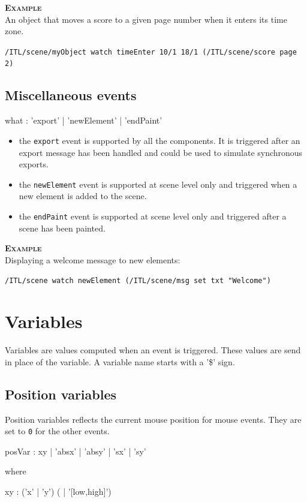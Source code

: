 \documentclass[a4paper,twoside]{report}
\newcommand{\sublevel}[1]	{\section{#1}}
\newcommand{\subsublevel}[1]	{\subsection{#1}}
\newcommand{\OSC}[1]		{\texttt{#1}}
\newcommand{\values}[1]	{\texttt{#1}}
\newcommand{\example}		{\textbf{\hspace{-1.5cm}\textbf{\textsc{Example }}}}
\newcommand{\sample}	[1]			{\vspace{-2mm}\begin{center}\colorbox{mygrey}{
								\begin{minipage}[t]{0.9\columnwidth} 
								{\small \texttt{#1}}
								\end{minipage}}\end{center}}
\newcommand{\samplev}[1]			{\begin{center}\colorbox{mygrey}{
								\begin{minipage}[t]{\columnwidth} 
								{\small \texttt{#1}}
								\end{minipage}}\end{center}}
\begin{document}
\example \\
An object that moves a score to a given page number when it enters its time zone.
\samplev{/ITL/scene/myObject watch timeEnter 10/1 18/1 (/ITL/scene/score page 2)}


\subsublevel{Miscellaneous events}
\label{miscevents}

\begin{rail}
what : 	  'export'
		| 'newElement'
		| 'endPaint'
\end{rail}

\begin{itemize}
\item the \OSC{export} event is supported by all the components. It is triggered after an export message has been handled and could be used to simulate synchronous exports.
\item the \OSC{newElement} event is supported at scene level only and triggered when a new element is added to the scene.
\item the \OSC{endPaint} event is supported at scene level only and triggered after a scene has been painted.
\end{itemize}

\example \\
Displaying a welcome message to new elements:
\sample{/ITL/scene watch newElement (/ITL/scene/msg set txt "Welcome")}

\sublevel{Variables}
\label{interactvar}

Variables are values computed when an event is triggered. These values are send in place of the variable. A variable name starts with a '\$' sign. 

\subsublevel{Position variables}
\label{posvar}

Position variables reflects the current mouse position for mouse events. They are set to \values{0} for the other events. 

\begin{rail} 
posVar : xy | 'absx' | 'absy' | 'sx' | 'sy' 
\end{rail}

where
\begin{rail} 
xy : ('x' | 'y') ( | '[low,high]') 
\end{rail}
\end{document}
